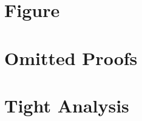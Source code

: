 
\newpage

\section{Figure}




\section{Omitted Proofs}
\label{sec:omitted}


\newpage






\section{Tight Analysis}
\label{sec:tight}

